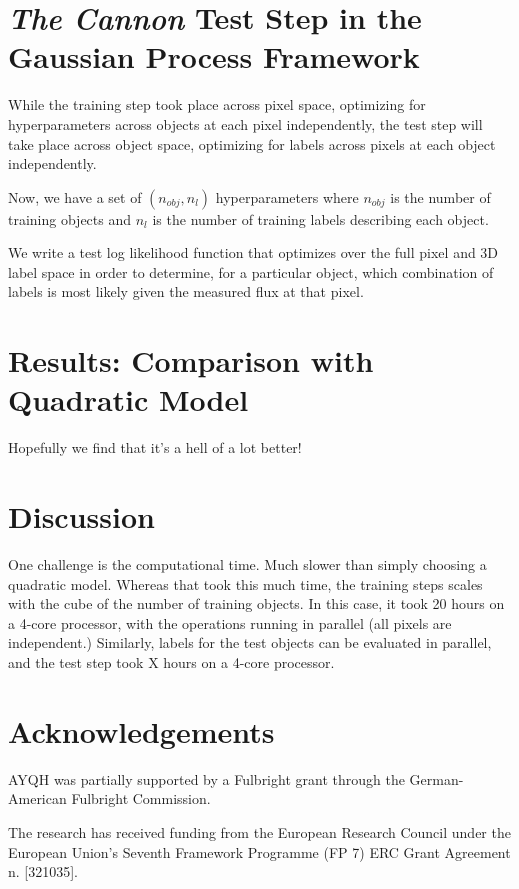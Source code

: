 \documentclass[12pt, preprint]{aastex}
\begin{document}
\section{\emph{The Cannon} Test Step in the Gaussian Process Framework}

While the training step took place across pixel space, optimizing for 
hyperparameters across objects at each pixel independently, the test step 
will take place across object space, optimizing for labels across pixels at 
each object independently.

Now, we have a set of $(n_{obj}, n_{l})$ hyperparameters where $n_{obj}$ is 
the number of training objects and $n_{l}$ is the number of training labels 
describing each object.

We write a test log likelihood function that optimizes over the full pixel 
and 3D label space in order to determine, for a particular object, which 
combination of labels is most likely given the measured flux at that pixel.

\section{Results: Comparison with Quadratic Model}

Hopefully we find that it's a hell of a lot better!

\section{Discussion}

One challenge is the computational time. Much slower than simply choosing 
a quadratic model. Whereas that took this much time, the training steps scales 
with the cube of the number of training objects. In this case, it took 20 
hours on a 4-core processor, with the operations running in parallel (all 
pixels are independent.) Similarly, labels for the test objects can be 
evaluated in parallel, and the test step took X hours on a 4-core processor. 

\section{Acknowledgements}

AYQH was partially supported by a Fulbright grant through the German-American
Fulbright Commission.

The research has received funding from the European Research Council under the
European Union's Seventh Framework Programme (FP 7) ERC Grant Agreement n.
[321035].


\end{document}
